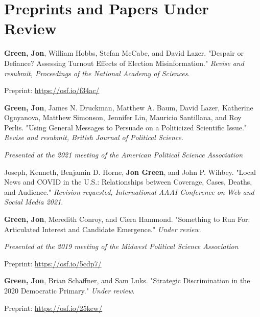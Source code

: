 \documentclass[letterpaper]{article}
\renewenvironment{itemize}{
  \begin{list}{}{
    \setlength{\leftmargin}{1.5em}
  }
}{
  \end{list}
}
\begin{document}
\section*{Preprints and Papers Under Review}

\begin{itemize}

\item  \textbf{Green, Jon}, William Hobbs, Stefan McCabe, and David Lazer. "Despair or Defiance? Assessing Turnout Effects of Election Misinformation."  \textit{Revise and resubmit, Proceedings of the National Academy of Sciences}.
\begin{itemize}
\item Preprint: \url{https://osf.io/f34ac/}
\end{itemize}

\item  \textbf{Green, Jon}, James N. Druckman, Matthew A. Baum, David Lazer, Katherine Ognyanova, Matthew Simonson, Jennifer Lin, Mauricio Santillana, and Roy Perlis. "Using General Messages to Persuade on a Politicized Scientific Issue." \textit{Revise and resubmit, British Journal of Political Science}.
\begin{itemize}
\item \textit{Presented at the 2021 meeting of the American Political Science Association}
\end{itemize}

\item Joseph, Kenneth, Benjamin D. Horne, \textbf{Jon Green}, and John P. Wihbey. "Local News and COVID in the U.S.: Relationships between Coverage, Cases, Deaths, and Audience." \textit{Revision requested, International AAAI Conference on Web and Social Media 2021}.

\item \textbf{Green, Jon}, Meredith Conroy, and Ciera Hammond. "Something to Run For: Articulated Interest and Candidate Emergence."  \textit{Under review}.
\begin{itemize}
\item \textit{Presented at the 2019 meeting of the Midwest Political Science Association}
\item Preprint: \url{https://osf.io/5cdp7/}
\end{itemize}

\item \textbf{Green, Jon}, Brian Schaffner, and Sam Luks. "Strategic Discrimination in the 2020 Democratic Primary."  \textit{Under review}.
\begin{itemize}
\item Preprint: \url{https://osf.io/25kew/}
\end{itemize}


\end{itemize}
\end{document}

